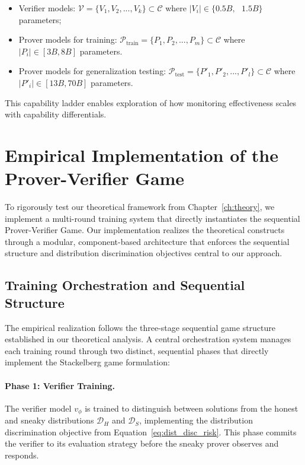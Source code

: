 \begin{itemize}
    \item Verifier models: $\mathcal{V} = \{V_1, V_2, ..., V_k\} \subset \mathcal{C}$ where $|V_i| \in \{0.5B, \text{ } 1.5B\}$ parameters;
    \item Prover models for training: $\mathcal{P}_{\text{train}} = \{P_1, P_2, ..., P_m\} \subset \mathcal{C}$ where $|P_i| \in [3B, 8B]$ parameters.
    \item Prover models for generalization testing: $\mathcal{P}_{\text{test}} = \{P'_1, P'_2, ..., P'_l\} \subset \mathcal{C}$ where $|P'_i| \in [13B, 70B]$ parameters.
\end{itemize}\noindent
This capability ladder enables exploration of how monitoring effectiveness scales with capability differentials.

\section{Empirical Implementation of the Prover-Verifier Game}
\label{sec:empirical_implementation}

To rigorously test our theoretical framework from Chapter~\ref{ch:theory}, we implement a multi-round training system that directly instantiates the sequential Prover-Verifier Game. Our implementation realizes the theoretical constructs through a modular, component-based architecture that enforces the sequential structure and distribution discrimination objectives central to our approach.

\subsection{Training Orchestration and Sequential Structure}

The empirical realization follows the three-stage sequential game structure established in our theoretical analysis. A central orchestration system manages each training round through two distinct, sequential phases that directly implement the Stackelberg game formulation:

\paragraph{Phase 1: Verifier Training.} The verifier model $v_\phi$ is trained to distinguish between solutions from the honest and sneaky distributions $\mathcal{D}_H$ and $\mathcal{D}_S$, implementing the distribution discrimination objective from Equation~\eqref{eq:dist_disc_risk}. This phase commits the verifier to its evaluation strategy before the sneaky prover observes and responds.

